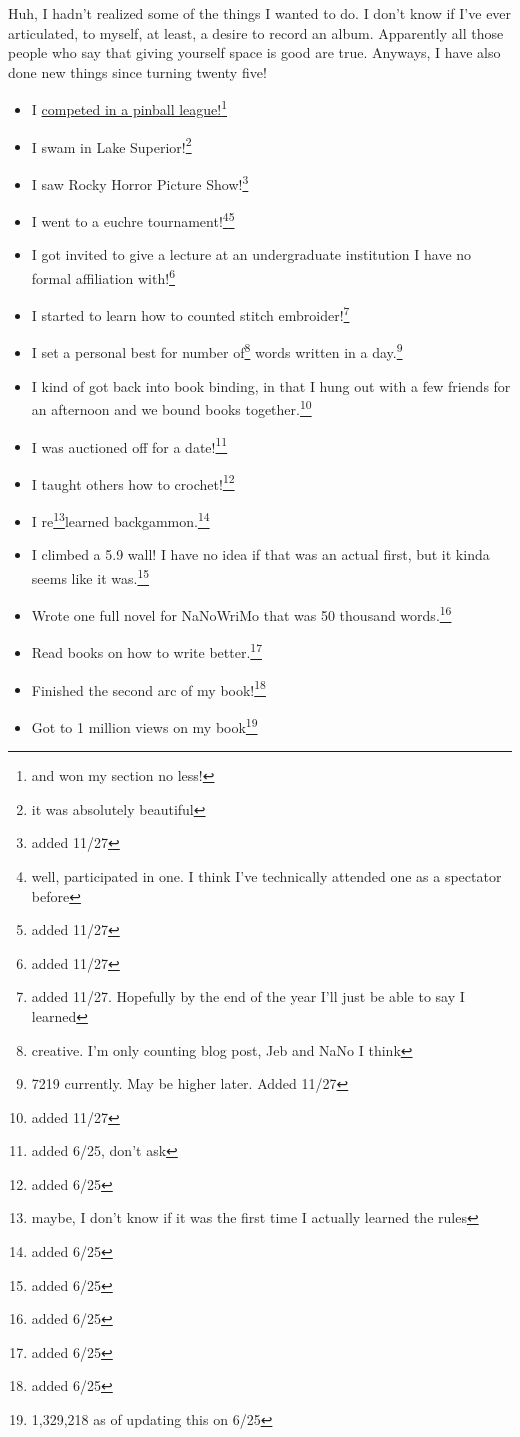 \documentclass[12pt]{article}[titlepage]
\newcommand{\1}{\={a}}
\newcommand{\2}{\={e}}
\newcommand{\3}{\={\i}}
\newcommand{\4}{\=o}
\newcommand{\5}{\=u}
\newcommand{\6}{\={A}}
\renewcommand{\,}{\textsuperscript{,}}
\begin{document}
Huh, I hadn't realized some of the things I wanted to do.
I don't know if I've ever articulated, to myself, at least, a desire to record an album.
Apparently all those people who say that giving yourself space is good are true.
Anyways, I have also done new things since turning twenty five!
\begin{itemize}
\item I \href{pinball.html}{competed in a pinball league!}\footnote{and won my section no less!}
\item I swam in Lake Superior!\footnote{it was absolutely beautiful}
\item I saw Rocky Horror Picture Show!\footnote{added 11/27}
\item I went to a euchre tournament!\footnote{well, participated in one. I think I've technically attended one as a spectator before}\footnote{added 11/27}
\item I got invited to give a lecture at an undergraduate institution I have no formal affiliation with!\footnote{added 11/27}
\item I started to learn how to counted stitch embroider!\footnote{added 11/27. Hopefully by the end of the year I'll just be able to say I learned}
\item I set a personal best for number of\footnote{creative. I'm only counting blog post, Jeb and NaNo I think} words written in a day.\footnote{7219 currently. May be higher later. Added 11/27}
\item I kind of got back into book binding, in that I hung out with a few friends for an afternoon and we bound books together.\footnote{added 11/27}
\item I was auctioned off for a date!\footnote{added 6/25, don't ask}
\item I taught others how to crochet!\footnote{added 6/25}
\item I re\footnote{maybe, I don't know if it was the first time I actually learned the rules}learned backgammon.\footnote{added 6/25}
\item I climbed a 5.9 wall! I have no idea if that was an actual first, but it kinda seems like it was.\footnote{added 6/25}
\item Wrote one full novel for NaNoWriMo that was 50 thousand words.\footnote{added 6/25}
\item Read books on how to write better.\footnote{added 6/25}
\item Finished the second arc of my book!\footnote{added 6/25}
\item Got to 1 million views on my book\footnote{1,329,218 as of updating this on 6/25}

\end{itemize}
\end{document}
